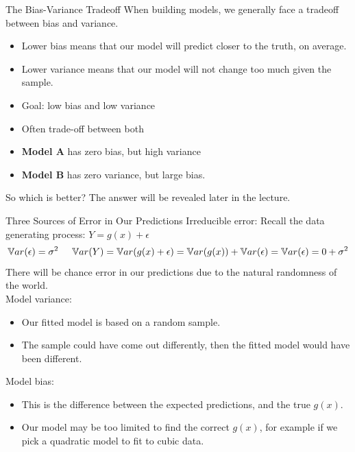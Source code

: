 \documentclass[aspectratio=169]{../latex_main/tntbeamer}  %
\begin{document}
	
	\begin{frame}[c]{The Bias-Variance Tradeoff}
	   When building models, we generally face a tradeoff between bias and variance.
	   \begin{itemize}
	       \item Lower bias means that our model will predict closer to the truth, on average.
	       \item Lower variance means that our model will not change too much given the sample.
	   \end{itemize}
	   \bigskip
	   \begin{itemize}
	    \item Goal: low bias and low variance
	    \item Often trade-off between both
	    \item \textbf{Model A} has zero bias, but high variance
	    \item \textbf{Model B} has zero variance, but large bias.
	   \end{itemize}

	   \bigskip
	   So which is better? The answer will be revealed later in the lecture.
	\end{frame}
	
	
	\begin{frame}[c]{Three Sources of Error in Our Predictions}
	   Irreducible error: Recall the data generating process: $Y = g(x) + \epsilon$
	   \begin{equation*}
	       \mathbb{V}ar(\epsilon) = \sigma^2 \hspace{5mm} \mathbb{V}ar(Y) = \mathbb{V}ar(g(x) + \epsilon) = \mathbb{V}ar(g(x)) + \mathbb{V}ar(\epsilon) = \mathbb{V}ar(\epsilon) = 0 + \sigma^2
	   \end{equation*}
	   There will be chance error in our predictions due to the natural randomness of the world.\\
	   \bigskip
	   \alert{Model variance:} 
	   \begin{itemize}
	       \item Our fitted model is based on a random sample.
	       \item The sample could have come out differently, then the fitted model would have been different.
	   \end{itemize}

        \alert{Model bias:}
        \begin{itemize}
            \item This is the difference between the expected predictions, and the true $g(x)$.
            \item Our model may be too limited to find the correct $g(x)$, for example if we pick a quadratic model to fit to cubic data.
        \end{itemize}

	\end{frame}
	
\end{document}
